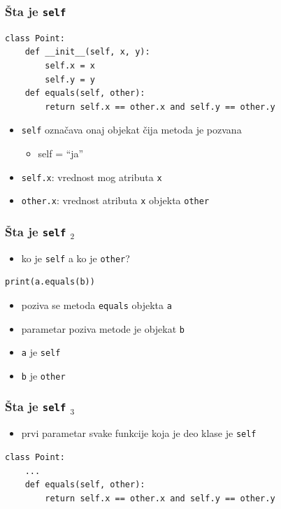 \documentclass[utf8,compress,aspectratio=169]{beamer}
\begin{document}
\begin{frame}[fragile]
  \frametitle{Šta je \texttt{self}}
\begin{verbatim}
class Point:
    def __init__(self, x, y):
        self.x = x
        self.y = y
    def equals(self, other):
        return self.x == other.x and self.y == other.y
\end{verbatim}
  \begin{itemize}
    \item \texttt{self} označava onaj objekat čija metoda je pozvana
    \begin{itemize}
      \item self = ``ja''
    \end{itemize}
    \item \texttt{self.x}: vrednost mog atributa \texttt{x}
    \item \texttt{other.x}: vrednost atributa \texttt{x} objekta \texttt{other}
  \end{itemize}
\end{frame}

\begin{frame}[fragile]
  \frametitle{Šta je \texttt{self} $_2$}
  \begin{itemize}
    \item ko je \texttt{self} a ko je \texttt{other}?
  \end{itemize}
\begin{verbatim}
print(a.equals(b))
\end{verbatim}
  \begin{itemize}
    \item poziva se metoda \texttt{equals} objekta \texttt{a}
    \item parametar poziva metode je objekat \texttt{b}
    \item \texttt{a} je \texttt{self}
    \item \texttt{b} je \texttt{other}
  \end{itemize}
\end{frame}

\begin{frame}[fragile]
  \frametitle{Šta je \texttt{self} $_3$}
  \begin{itemize}
    \item prvi parametar svake funkcije koja je deo klase je \texttt{self}
  \end{itemize}
\begin{verbatim}
class Point:
    ...
    def equals(self, other):
        return self.x == other.x and self.y == other.y
\end{verbatim}
\end{frame}
\end{document}
